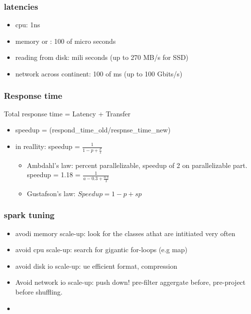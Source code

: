 \subsubsection{latencies}
\begin{itemize}
    \item cpu: 1ns
    \item memory or : 100 of micro seconds
    \item reading from disk: mili seconds (up to 270 MB/s for SSD)
    \item network across continent: 100 of ms (up to 100 Gbits/s)
\end{itemize}


\subsubsection{Response time}
Total response time = Latency + Transfer

\begin{itemize}
    \item speedup = (respond_time_old/respnse_time_new)
    \item in reallity: speedup = $\frac{1}{1-p+\frac{p}{s}}$
    \begin{itemize}
        \item Ambdahl's law: percent parallelizable, speedup of 2 on parallelizable part.
        \textrightarrow speedup = 1.18 = $\frac{1}{a-0.3+\frac{0.3}{2}}$
        \item Gustafson's law: $Speedup= 1-p+sp$
    \end{itemize}
\end{itemize}


\subsubsection{spark tuning}
\begin{itemize}
    \item avodi memory scale-up: look for the classes athat are intitiated very often
    \item avoid cpu scale-up: search for gigantic for-loops (e.g map)
    \item avoid disk io scale-up: ue efficient format, compression
    \item Avoid network io scale-up: push down! pre-filter aggergate before, pre-project before shuffling.
    \item
\end{itemize}

